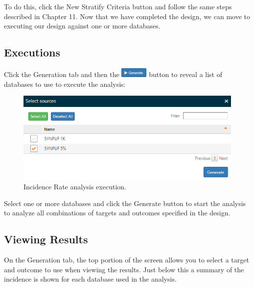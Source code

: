 \documentclass[11pt]{book}
\theoremstyle{definition}
\theoremstyle{definition}
\theoremstyle{definition}
\theoremstyle{remark}
\begin{document}
To do this, click the New Stratify Criteria button and follow the same steps described in Chapter 11. Now that we have completed the design, we can move to executing our design against one or more databases.

\hypertarget{executions-2}{%
\subsection{Executions}\label{executions-2}}

Click the Generation tab and then the \includegraphics{images/Characterization/atlasIncidenceGenerate.png} button to reveal a list of databases to use to execute the analysis:

\begin{figure}

{\centering \includegraphics[width=1\linewidth]{images/Characterization/atlasIncidenceSourceSelection} 

}

\caption{Incidence Rate analysis execution.}\label{fig:atlasIncidenceSourceSelection}
\end{figure}

Select one or more databases and click the Generate button to start the analysis to analyze all combinations of targets and outcomes specified in the design.

\hypertarget{viewing-results-1}{%
\subsection{Viewing Results}\label{viewing-results-1}}

On the Generation tab, the top portion of the screen allows you to select a target and outcome to use when viewing the results. Just below this a summary of the incidence is shown for each database used in the analysis.
\end{document}
